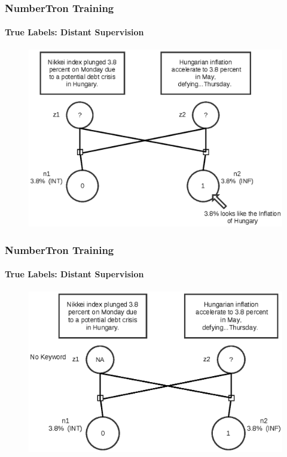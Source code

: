\documentclass{beamer}
\begin{document}
\begin{frame}
\frametitle{NumberTron Training}
\framesubtitle{True Labels: Distant Supervision}
\begin{figure}
\includegraphics[width=\textwidth, height=0.8\textheight]{images/truelabel12.eps}
\end{figure}
\end{frame}


\begin{frame}
\frametitle{NumberTron Training}
\framesubtitle{True Labels: Distant Supervision}
\begin{figure}
\includegraphics[width=\textwidth, height=0.8\textheight]{images/truelabel13.eps}
\end{figure}
\end{frame}
\end{document}

